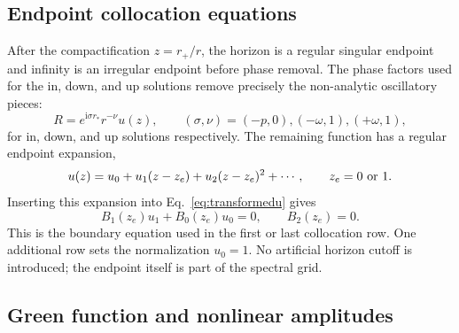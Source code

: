 \documentclass[aps,prd,twocolumn,nofootinbib,superscriptaddress,10pt,floatfix]{revtex4-2}
\newcommand{\ii}{\mathrm{i}}
\newcommand{\rp}{r_+}
\begin{document}
\subsection{Endpoint collocation equations}

After the compactification $z=\rp/r$, the horizon is a regular singular
endpoint and infinity is an irregular endpoint before phase removal.  The
phase factors used for the in, down, and up solutions remove precisely the
non-analytic oscillatory pieces:
\begin{equation}
R=e^{\ii\sigma r_*}r^{-\nu}u(z),
\qquad
(\sigma,\nu)=(-p,0),(-\omega,1),(+\omega,1),
\end{equation}
for in, down, and up solutions respectively.  The remaining function has a
regular endpoint expansion,
\begin{equation}
u(z)=u_0+u_1(z-z_e)+u_2(z-z_e)^2+\cdots ,
\qquad z_e=0\ {\rm or}\ 1 .
\end{equation}
Inserting this expansion into Eq.~\eqref{eq:transformedu} gives
\begin{equation}
B_1(z_e)u_1+B_0(z_e)u_0=0,
\qquad B_2(z_e)=0.
\end{equation}
This is the boundary equation used in the first or last collocation row.  One
additional row sets the normalization $u_0=1$.  No artificial horizon cutoff is
introduced; the endpoint itself is part of the spectral grid.

\subsection{Green function and nonlinear amplitudes}
\end{document}

